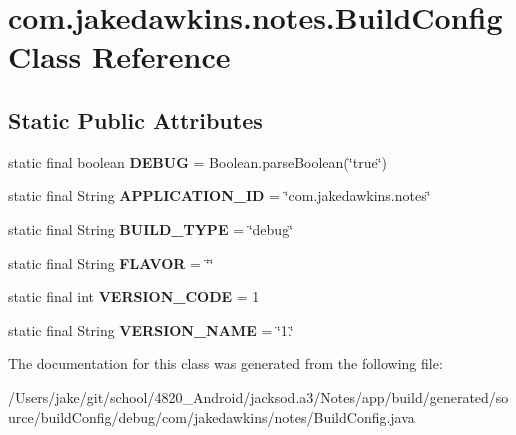 \hypertarget{classcom_1_1jakedawkins_1_1notes_1_1_build_config}{}\section{com.\+jakedawkins.\+notes.\+Build\+Config Class Reference}
\label{classcom_1_1jakedawkins_1_1notes_1_1_build_config}
\subsection*{Static Public Attributes}
\begin{DoxyCompactItemize}
\item 
static final boolean {\bfseries D\+E\+B\+UG} = Boolean.\+parse\+Boolean(\char`\"{}true\char`\"{})\hypertarget{classcom_1_1jakedawkins_1_1notes_1_1_build_config_a43b095a615f93437855b330351c612f7}{}\label{classcom_1_1jakedawkins_1_1notes_1_1_build_config_a43b095a615f93437855b330351c612f7}

\item 
static final String {\bfseries A\+P\+P\+L\+I\+C\+A\+T\+I\+O\+N\+\_\+\+ID} = \char`\"{}com.\+jakedawkins.\+notes\char`\"{}\hypertarget{classcom_1_1jakedawkins_1_1notes_1_1_build_config_a63577ff72567cc799b6d73d0cd2fb999}{}\label{classcom_1_1jakedawkins_1_1notes_1_1_build_config_a63577ff72567cc799b6d73d0cd2fb999}

\item 
static final String {\bfseries B\+U\+I\+L\+D\+\_\+\+T\+Y\+PE} = \char`\"{}debug\char`\"{}\hypertarget{classcom_1_1jakedawkins_1_1notes_1_1_build_config_afdef5345b0eea0590a66c26a319808a6}{}\label{classcom_1_1jakedawkins_1_1notes_1_1_build_config_afdef5345b0eea0590a66c26a319808a6}

\item 
static final String {\bfseries F\+L\+A\+V\+OR} = \char`\"{}\char`\"{}\hypertarget{classcom_1_1jakedawkins_1_1notes_1_1_build_config_a1812eb7f586fb610a68759c4700fff28}{}\label{classcom_1_1jakedawkins_1_1notes_1_1_build_config_a1812eb7f586fb610a68759c4700fff28}

\item 
static final int {\bfseries V\+E\+R\+S\+I\+O\+N\+\_\+\+C\+O\+DE} = 1\hypertarget{classcom_1_1jakedawkins_1_1notes_1_1_build_config_a78c50c276dcfaad891df2797785b1a89}{}\label{classcom_1_1jakedawkins_1_1notes_1_1_build_config_a78c50c276dcfaad891df2797785b1a89}

\item 
static final String {\bfseries V\+E\+R\+S\+I\+O\+N\+\_\+\+N\+A\+ME} = \char`\"{}1.\char`\"{}\hypertarget{classcom_1_1jakedawkins_1_1notes_1_1_build_config_a447c2376494444795ebcd6c2b66b62ba}{}\label{classcom_1_1jakedawkins_1_1notes_1_1_build_config_a447c2376494444795ebcd6c2b66b62ba}

\end{DoxyCompactItemize}


The documentation for this class was generated from the following file\+:\begin{DoxyCompactItemize}
\item 
/\+Users/jake/git/school/4820\+\_\+\+Android/jacksod.\+a3/\+Notes/app/build/generated/source/build\+Config/debug/com/jakedawkins/notes/Build\+Config.\+java\end{DoxyCompactItemize}
